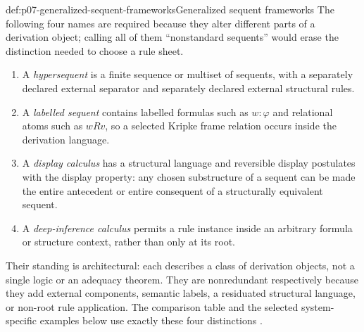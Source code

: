 \begin{hbdefinition}{def:p07-generalized-sequent-frameworks}{Generalized sequent frameworks}
The following four names are required because they alter different parts of
a derivation object; calling all of them ``nonstandard sequents'' would erase
the distinction needed to choose a rule sheet.
\begin{enumerate}
  \item A \emph{hypersequent} is a finite sequence or multiset of sequents,
        with a separately declared external separator and separately declared
        external structural rules.
  \item A \emph{labelled sequent} contains labelled formulas such as
        \(w{:}\varphi\) and relational atoms such as \(wRv\), so a selected
        Kripke frame relation occurs inside the derivation language.
  \item A \emph{display calculus} has a structural language and reversible
        display postulates with the display property: any chosen substructure
        of a sequent can be made the entire antecedent or entire consequent of
        a structurally equivalent sequent.
  \item A \emph{deep-inference calculus} permits a rule instance inside an
        arbitrary formula or structure context, rather than only at its root.
\end{enumerate}
Their standing is architectural: each describes a class of derivation
objects, not a single logic or an adequacy theorem.  They are nonredundant
  respectively because they add external components, semantic labels, a
  residuated structural language, or non-root rule application.  The comparison
  table and the selected system-specific examples below use exactly these four
  distinctions
  \cite{Avron1996,Negri2005,Belnap1982,Wansing1994,Guglielmi2007,Stouppa2007}.
\end{hbdefinition}


